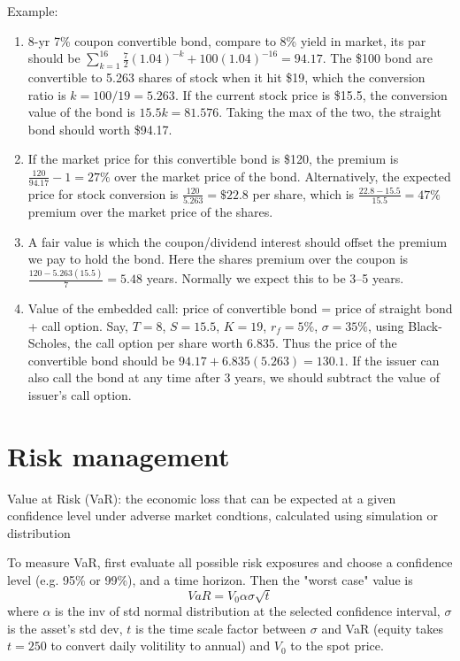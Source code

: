 \documentclass[9pt,twocolumn]{extarticle}
\begin{document}
Example:
\begin{enumerate}
\item 8-yr 7\% coupon convertible bond, compare to 8\% yield in market, its
par should be $\sum_{k=1}^{16} \frac{7}{2}(1.04)^{-k} + 100(1.04)^{-16} = 94.17$.
The \$100 bond are convertible to 5.263 shares of stock when it hit \$19, which
the conversion ratio is $k=100/19=5.263$. If the current stock price is \$15.5,
the conversion value of the bond is $15.5k=81.576$. Taking the max of the two,
the straight bond should worth \$94.17.
\item If the market price for this convertible bond is \$120, the premium is
$\frac{120}{94.17}-1 = 27\%$ over the market price of the bond. Alternatively,
the expected price for stock conversion is $\frac{120}{5.263}=\$22.8$ per
share, which is $\frac{22.8-15.5}{15.5}=47\%$ premium over the market price of
the shares.
\item A fair value is which the coupon/dividend interest
should offset the premium we pay to hold the bond. Here the shares premium over
the coupon is $\frac{120-5.263(15.5)}{7} = 5.48$ years. Normally we expect this
to be 3--5 years.
\item Value of the embedded call: price of convertible bond = price of straight
bond + call option. Say, $T=8$, $S=15.5$, $K=19$, $r_f=5\%$, $\sigma=35\%$,
using Black-Scholes, the call option per share worth $6.835$. Thus the price of
the convertible bond should be $94.17 + 6.835(5.263) = 130.1$. If the issuer
can also call the bond at any time after 3 years, we should subtract the value
of issuer's call option.
\end{enumerate}

\section{Risk management}
Value at Risk (VaR): the economic loss that can be expected at a given
confidence level under adverse market condtions, calculated using simulation or
distribution

To measure VaR, first evaluate all possible risk exposures and choose a
confidence level (e.g. 95\% or 99\%), and a time horizon. Then the "worst case"
value is\[
VaR = V_0 \alpha \sigma \sqrt{t}
\]
where $\alpha$ is the inv of std normal distribution at the selected confidence
interval, $\sigma$ is the asset's std dev, $t$ is the time scale factor between
$\sigma$ and VaR (equity takes $t=250$ to convert daily volitility to annual)
and $V_0$ to the spot price.
\end{document}
